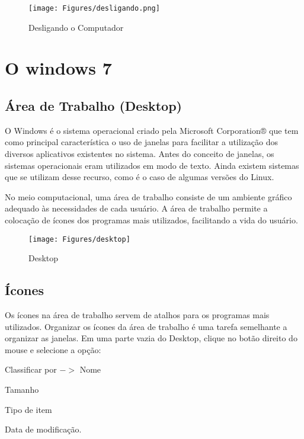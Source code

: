 \documentclass[hidelinks,12pt]{article}
\begin{document}
\begin{figure}[!hb]
	\centering	
	\texttt{[image: Figures/desligando.png]}
	\caption{Desligando o Computador}
	\label{fig:desligando}
\end{figure}

\newpage

\section{O windows 7}
\subsection{Área de Trabalho (Desktop)}

O Windows é o sistema operacional criado pela Microsoft Corporation® que tem como principal característica o uso de janelas para facilitar a utilização dos diversos aplicativos existentes no sistema. Antes do conceito de janelas, os sistemas operacionais eram utilizados em modo de texto. Ainda existem sistemas que se utilizam desse recurso, como é o caso de algumas versões do Linux.

No meio computacional, uma área de trabalho consiste de um ambiente gráfico adequado às necessidades de cada usuário. A área de trabalho permite a colocação de ícones dos programas mais utilizados, facilitando a vida do usuário.\\

\begin{figure}[!hb]
	\centering
	\texttt{[image: Figures/desktop]}
	\caption{Desktop}
	\label{fig:desktop}
\end{figure}


\subsection{Ícones}
	Os ícones na área de trabalho servem de atalhos para os programas mais utilizados.	
	Organizar os ícones da área de trabalho é uma tarefa semelhante a organizar as janelas. Em uma parte vazia do Desktop, clique no botão direito do mouse e selecione a opção: 

	Classificar por $->$ Nome
	
	 \hspace{3.6cm}Tamanho
	 
	 \hspace{3.6cm}Tipo de item
	 
	 \hspace{3.6cm}Data de modificação.
	
\end{document}
